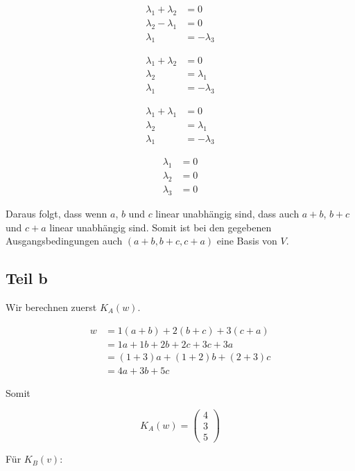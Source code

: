 \documentclass[a4paper,german,12pt,smallheadings]{scrartcl}
\begin{document}
\begin{align*}
  \lambda_1 + \lambda_2 &= 0 \\
  \lambda_2 - \lambda_1 &= 0 \\
  \lambda_1 &= -\lambda_3
\end{align*}

\begin{align*}
  \lambda_1 + \lambda_2 &= 0 \\
  \lambda_2 &= \lambda_1 \\
  \lambda_1 &= -\lambda_3
\end{align*}

\begin{align*}
  \lambda_1 + \lambda_1 &= 0 \\
  \lambda_2 &= \lambda_1 \\
  \lambda_1 &= -\lambda_3
\end{align*}

\begin{align*}
  \lambda_1 &= 0 \\
  \lambda_2 &= 0 \\
  \lambda_3 &= 0
\end{align*}

Daraus folgt, dass wenn $a$, $b$ und $c$ linear unabhängig sind, dass auch
$a+b$, $b+c$ und $c+a$ linear unabhängig sind. Somit ist bei den gegebenen
Ausgangsbedingungen auch $(a+b, b+c, c+a)$ eine Basis von $V$.


\subsection*{Teil b}

Wir berechnen zuerst $K_A(w)$.

\begin{align*}
  w &= 1(a+b) + 2(b+c) + 3(c+a) \\
    &= 1a + 1b + 2b + 2c + 3c + 3a \\
    &= (1+3)a + (1+2)b + (2+3)c \\
    &= 4a + 3b + 5c
\end{align*}

Somit

\begin{equation*}
  K_A(w) = \begin{pmatrix} 4 \\ 3 \\ 5 \end{pmatrix}
\end{equation*}

Für $K_B(v)$:
\end{document}
